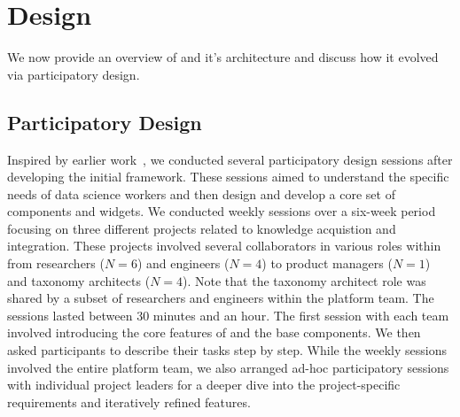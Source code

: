 \section{\system Design}
\label{sec:system}
We now provide an overview of \system and it's architecture and discuss how it evolved via participatory design. 


\subsection{Participatory Design}

Inspired by earlier work~\cite{bauerle2022symphony, rahman2020mixtape}, we conducted several participatory design sessions after developing the initial \system framework. These sessions aimed to understand the specific needs of data science workers and then design and develop a core set of \system components and widgets. We conducted weekly sessions over a six-week period focusing on three different projects related to knowledge acquistion and integration. These projects involved several collaborators in various roles within \company 
from researchers ($N=6$) %
and engineers ($N=4$) %
to product managers ($N=1$) %
and taxonomy architects ($N=4$). %
Note that the taxonomy architect role was shared by a subset of 
researchers and engineers within the platform team.
The sessions lasted between 30 minutes and an hour.
The first session with each team involved introducing the core features of \system and the base components. We then asked participants to describe their tasks step by step.
While the weekly sessions involved the entire platform team, 
we also arranged ad-hoc participatory sessions
with individual project leaders for a deeper dive into 
the project-specific requirements and 
iteratively refined \system features.


